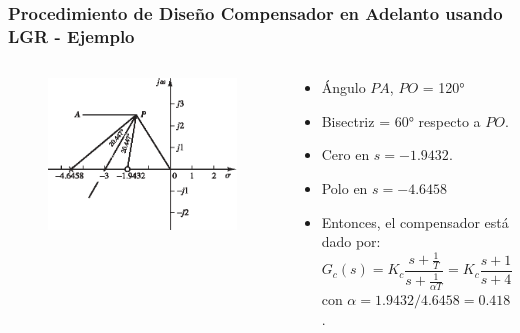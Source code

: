 \documentclass[aspectratio=169,handout]{beamer}
\newcommand*{\rootlocusexample}[4]{%
		\foreach \x in {#1,...,#2}{
			\ifthenelse{\x=0}{}
		  {%
   			\draw (\x cm,1pt) -- (\x cm,-1pt) node[anchor=north] {$\x$};
		  }
		}
		\foreach \y in {#3,...,#4}{
			\ifthenelse{\y=0}{}
		  {%
   			\draw (-1pt,\y cm) -- (1pt,\y cm) node[anchor=east] {$\y$};
		  }
   	}
		\draw [-latex] (#1,0) -- (#2,0) node [above]  {$\sigma$};
		\draw [-latex] (0,#3) -- (0,#4) node [right] {$j\omega$};
}
\theoremstyle{definition}
\theoremstyle{plain}
\theoremstyle{remark}
\begin{document}
\begin{frame}[<+->]\frametitle{Procedimiento de Diseño Compensador en Adelanto usando LGR - Ejemplo}
\begin{columns}
	\begin{column}{0.5\textwidth}
	\begin{figure}
		\includegraphics[width=7cm]{images/ejemplo1_poloycero2.eps}
	\end{figure}
	\end{column}
	\begin{column}{0.5\textwidth}
		\begin{itemize}
			\item Ángulo $PA$, $PO$ = \ang{120}
			\item Bisectriz = \ang{60} respecto a $PO$.
			\item Cero en $s = -1.9432$.
			\item Polo en $s = -4.6458$
			\item Entonces, el compensador está dado por:
			\begin{equation*}
				G_c(s) = K_c \frac{s+\frac{1}{T}}{s+\frac{1}{\alpha T}} = K_c\frac{s+1.9432}{s+4.6458}
			\end{equation*}
			con $\alpha = 1.9432/4.6458 = 0.418$.
		\end{itemize}	
	\end{column}
\end{columns}
\end{frame}
\end{document}
